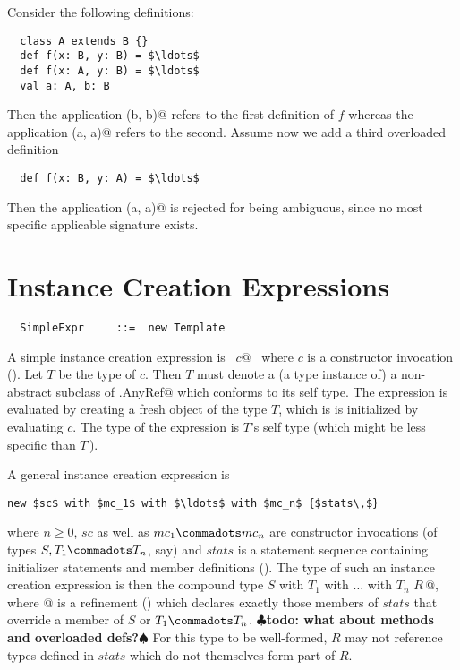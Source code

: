 \documentclass[a4paper,12pt,twoside,titlepage]{book}
\renewcommand{\todo}[1]{{$\clubsuit$\bf todo: #1$\spadesuit$}}
\begin{document}
\example Consider the following definitions:

\begin{lstlisting}
  class A extends B {}
  def f(x: B, y: B) = $\ldots$
  def f(x: A, y: B) = $\ldots$
  val a: A, b: B
\end{lstlisting}
Then the application \lstinline@f(b, b)@ refers to the first
definition of $f$ whereas the application \lstinline@f(a, a)@
refers to the second.  Assume now we add a third overloaded definition
\begin{lstlisting}
  def f(x: B, y: A) = $\ldots$
\end{lstlisting}
Then the application \lstinline@f(a, a)@ is rejected for being ambiguous, since
no most specific applicable signature exists.

\section{Instance Creation Expressions}
\label{sec:inst-creation}

\syntax\begin{lstlisting}
  SimpleExpr     ::=  new Template
\end{lstlisting}

A simple instance creation expression is ~\lstinline@new $c$@~ where $c$
is a constructor invocation ().  Let $T$
be the type of $c$. Then $T$ must denote a (a type instance
of) a non-abstract subclass of \lstinline@scala.AnyRef@ which
conforms to its self type. The expression is evaluated by creating a
fresh object of the type $T$, which is is initialized by
evaluating $c$. The type of the expression is $T$'s self
type (which might be less specific than $T\,$).

A general instance creation expression is
\begin{lstlisting}
new $sc$ with $mc_1$ with $\ldots$ with $mc_n$ {$stats\,$}
\end{lstlisting}
where $n \geq 0$, $sc$ as well as $mc_1 \commadots mc_n$ are
constructor invocations (of types $S, T_1 \commadots T_n$, say) and
$stats$ is a statement sequence containing initializer statements and
member definitions (). The type of such an instance
creation expression is then the compound type
\lstinline@$S$ with $T_1$ with $\ldots$ with $T_n$ {$R\,$}@,
where @ is
a refinement () which declares exactly those
members of $stats$ that override a member of $S$ or $T_1 \commadots
T_n$. \todo{what about methods and overloaded defs?}  For this type to
be well-formed, $R$ may not reference types defined in $stats$ which
do not themselves form part of $R$.
\end{document}
